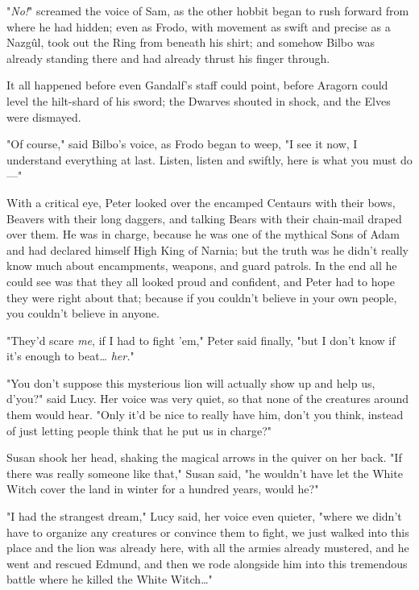 "\emph{No!}" screamed the voice of Sam, as the other hobbit began to rush
forward from where he had hidden; even as Frodo, with movement as swift and
precise as a Nazgûl, took out the Ring from beneath his shirt; and somehow
Bilbo was already standing there and had already thrust his finger through.

It all happened before even Gandalf's staff could point, before Aragorn could
level the hilt-shard of his sword; the Dwarves shouted in shock, and the Elves
were dismayed.

"Of course," said Bilbo's voice, as Frodo began to weep, "I see it now, I
understand everything at last. Listen, listen and swiftly, here is what you
must do---"

\noindent{}With a critical eye, Peter looked over the encamped Centaurs with their bows,
Beavers with their long daggers, and talking Bears with their chain-mail draped
over them. He was in charge, because he was one of the mythical Sons of Adam
and had declared himself High King of Narnia; but the truth was he didn't
really know much about encampments, weapons, and guard patrols. In the end all
he could see was that they all looked proud and confident, and Peter had to
hope they were right about that; because if you couldn't believe in your own
people, you couldn't believe in anyone.

"They'd scare \emph{me}, if I had to fight 'em," Peter said finally, "but I
don't know if it's enough to beat{\ldots} \emph{her.}"

"You don't suppose this mysterious lion will actually show up and help us,
d'you?" said Lucy. Her voice was very quiet, so that none of the creatures
around them would hear. "Only it'd be nice to really have him, don't you think,
instead of just letting people think that he put us in charge?"

Susan shook her head, shaking the magical arrows in the quiver on her back. "If
there was really someone like that," Susan said, "he wouldn't have let the
White Witch cover the land in winter for a hundred years, would he?"

"I had the strangest dream," Lucy said, her voice even quieter, "where we
didn't have to organize any creatures or convince them to fight, we just walked
into this place and the lion was already here, with all the armies already
mustered, and he went and rescued Edmund, and then we rode alongside him into
this tremendous battle where he killed the White Witch{\ldots}"


